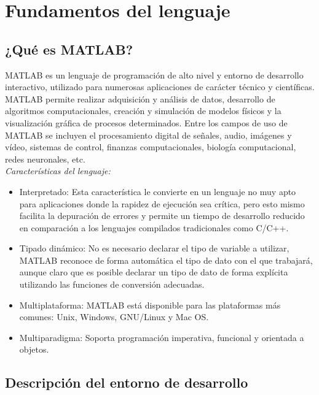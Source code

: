 \chapter{Fundamentos del lenguaje}

\section{¿Qué es MATLAB?}

MATLAB es un lenguaje de programación de alto nivel y entorno de desarrollo interactivo, utilizado 
para numerosas aplicaciones de carácter técnico y científicas. MATLAB permite realizar adquisición 
y análisis de datos, desarrollo de algoritmos computacionales, creación y simulación de modelos físicos 
y la visualización gráfica de procesos determinados.  Entre los campos de uso de MATLAB se incluyen 
el procesamiento digital de señales,  audio, imágenes y vídeo, sistemas de control, finanzas 
computacionales, biología computacional, redes neuronales, etc.\\

\textit{Características del lenguaje:}

\begin{itemize}
\item Interpretado: Esta característica le convierte en un lenguaje no muy apto para aplicaciones donde la rapidez de ejecución sea crítica, pero esto mismo facilita la depuración de errores y permite un tiempo de desarrollo reducido en comparación a los lenguajes compilados tradicionales como C/C++.

\item Tipado dinámico: No es necesario declarar el tipo de variable a utilizar, MATLAB reconoce de forma automática el tipo de dato con el que trabajará, aunque claro que es posible declarar un tipo de dato de forma explícita utilizando las funciones de conversión adecuadas.

\item Multiplataforma: MATLAB está disponible para las plataformas más comunes: Unix, Windows, GNU/Linux y Mac OS.

\item Multiparadigma: Soporta programación imperativa, funcional y orientada a objetos.
\end{itemize}


\section{Descripción del entorno de desarrollo}

